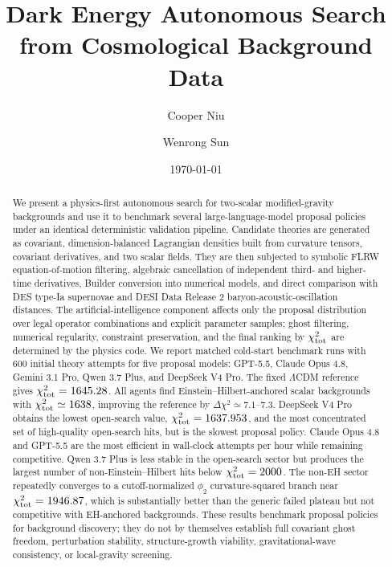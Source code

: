 \documentclass[aps,prd,twocolumn,superscriptaddress,nofootinbib,longbibliography]{revtex4-2}
\begin{document}

\title{Dark Energy Autonomous Search from Cosmological Background Data}

\author{Cooper Niu}

\author{Wenrong Sun}

\date{\today}


\begin{abstract}
We present a physics-first autonomous search for two-scalar modified-gravity backgrounds and use it to benchmark several large-language-model proposal policies under an identical deterministic validation pipeline.  Candidate theories are generated as covariant, dimension-balanced Lagrangian densities built from curvature tensors, covariant derivatives, and two scalar fields.  They are then subjected to symbolic FLRW equation-of-motion filtering, algebraic cancellation of independent third- and higher-time derivatives, Builder conversion into numerical models, and direct comparison with DES type-Ia supernovae and DESI Data Release 2 baryon-acoustic-oscillation distances.  The artificial-intelligence component affects only the proposal distribution over legal operator combinations and explicit parameter samples; ghost filtering, numerical regularity, constraint preservation, and the final ranking by $\chi^2_{\rm tot}$ are determined by the physics code.  We report matched cold-start benchmark runs with 600 initial theory attempts for five proposal models: GPT-5.5, Claude Opus 4.8, Gemini 3.1 Pro, Qwen 3.7 Plus, and DeepSeek V4 Pro.  The fixed $\Lambda$CDM reference gives $\chi^2_{\rm tot}=1645.28$.  All agents find Einstein--Hilbert-anchored scalar backgrounds with $\chi^2_{\rm tot}\simeq 1638$, improving the reference by $\Delta\chi^2\simeq 7.1$--$7.3$.  DeepSeek V4 Pro obtains the lowest open-search value, $\chi^2_{\rm tot}=1637.953$, and the most concentrated set of high-quality open-search hits, but is the slowest proposal policy.  Claude Opus 4.8 and GPT-5.5 are the most efficient in wall-clock attempts per hour while remaining competitive.  Qwen 3.7 Plus is less stable in the open-search sector but produces the largest number of non-Einstein--Hilbert hits below $\chi^2_{\rm tot}=2000$.  The non-EH sector repeatedly converges to a cutoff-normalized $\phi_2$ curvature-squared branch near $\chi^2_{\rm tot}=1946.87$, which is substantially better than the generic failed plateau but not competitive with EH-anchored backgrounds.  These results benchmark proposal policies for background discovery; they do not by themselves establish full covariant ghost freedom, perturbation stability, structure-growth viability, gravitational-wave consistency, or local-gravity screening.
\end{abstract}
\end{document}
